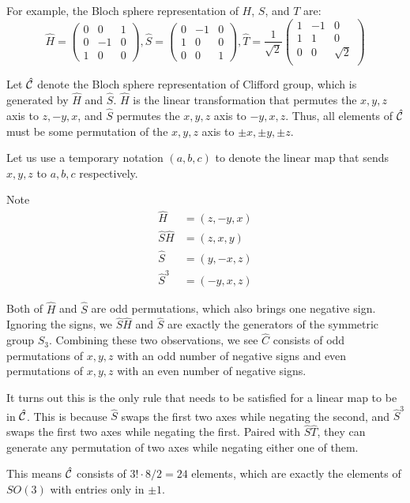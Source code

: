 For example, the Bloch sphere representation of $H$, $S$, and $T$ are:
\begin{equation}\label{eq:bloch-representation}
\hat{H} = \begin{pmatrix}
0 & 0 & 1 \\
0 & -1 & 0 \\
1 & 0 & 0
\end{pmatrix},  
\hat{S} = \begin{pmatrix}
0 & -1 & 0 \\
1 & 0 & 0 \\
0 & 0 & 1
\end{pmatrix},  
\hat{T} = \frac{1}{\sqrt{2}}\begin{pmatrix}
1 & -1 & 0 \\
1 & 1 & 0 \\
0 & 0 & \sqrt{2} \\
\end{pmatrix}
\end{equation}

\begin{remark}\label{remark:clifford-so3}
	Let $\hat{\mathcal{C}}$ denote the Bloch sphere representation of Clifford group, which is generated by $\hat{H}$ and $\hat{S}$.
	$\hat{H}$ is the linear transformation that permutes the $x, y, z$ axis to $z, -y, x$, and $\hat{S}$ permutes the $x, y, z$ axis to $-y, x, z$.
	Thus, all elements of  $\hat{\mathcal{C}}$ must be some permutation of the $x, y, z$ axis to $\pm x, \pm y, \pm z$.

	Let us use a temporary notation $(a, b, c)$ to denote the linear map that sends $x, y, z$ to $a, b, c$ respectively.

	Note 
	\begin{align*}
		\hat{H} &= (z, -y, x) \\
		\hat{S} \hat{H} &= (z, x, y)\\ 
		\hat{S}  &= (y, -x, z) \\
		\hat{S}^3 &= (-y, x, z)
	\end{align*}

	Both of $\hat{H}$ and $\hat{S}$ are odd permutations, which also brings one negative sign. 
	Ignoring the signs, we $\hat{S} \hat{H}$ and $\hat{S}$ are exactly the generators of the symmetric group $S_3$. 
	Combining these two observations, we see $\hat{C}$ consists of odd permutations of $x, y, z$ with an odd number of negative signs and even permutations of $x, y, z$ with an even number of negative signs.

	It turns out this is the only rule that needs to be satisfied for a linear map to be in $\hat{\mathcal{C}}$.
	This is because $\hat{S}$ swaps the first two axes while negating the second, and $\hat{S}^3$ swaps the first two axes while negating the first.
	Paired with $\hat{S}\hat{T}$, they can generate any permutation of two axes while negating either one of them.

	This means $\hat{\mathcal{C}}$ consists of $3! \cdot 8 / 2 = 24$ elements, which are exactly the elements of $SO(3)$ with entries only in $\pm 1$.
\end{remark}

